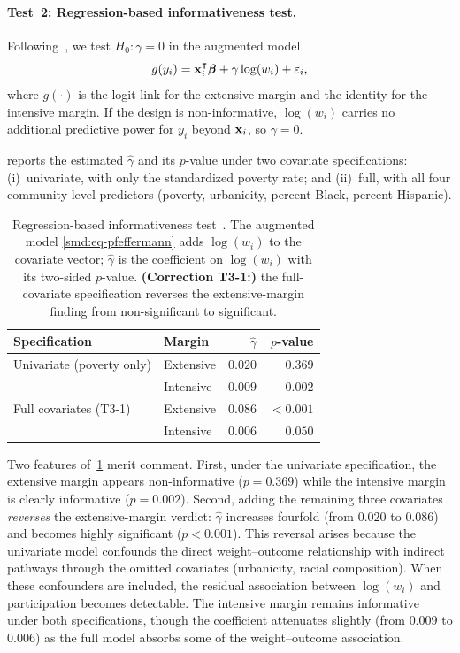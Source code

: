 \paragraph{Test~2: Regression-based informativeness test.}
Following~\citet{Pfeffermann1993}, we test $H_0\colon \gamma = 0$ in
the augmented model
\begin{equation}\label{smd:eq-pfeffermann}
  g(y_i) = \mathbf{x}_i^\intercal \boldsymbol{\beta} + \gamma \log(w_i) + \varepsilon_i,
\end{equation}
where $g(\cdot)$ is the logit link for the extensive margin and the
identity for the intensive margin.  If the design is non-informative,
$\log(w_i)$ carries no additional predictive power for $y_i$ beyond
$\mathbf{x}_i$, so $\gamma = 0$.

 reports the estimated $\hat{\gamma}$ and
its $p$-value under two covariate specifications: (i)~univariate, with
only the standardized poverty rate; and (ii)~full, with all four
community-level predictors (poverty, urbanicity, percent Black, percent
Hispanic).

\begin{table}[htbp]
  \centering
  \caption{Regression-based informativeness test~\citep{Pfeffermann1993}.
    The augmented model \eqref{smd:eq-pfeffermann} adds $\log(w_i)$ to the
    covariate vector; $\hat{\gamma}$ is the coefficient on $\log(w_i)$
    with its two-sided $p$-value.  {\upshape\textbf{(Correction T3-1:)}}
    the full-covariate specification reverses the extensive-margin
    finding from non-significant to significant.}
  \label{smd:tab-pfeffermann}
  \smallskip
  \begin{tabular}{llrr}
    \toprule
    Specification & Margin & $\hat{\gamma}$ & $p$-value \\
    \midrule
    Univariate (poverty only)
      & Extensive  & $0.020$  & $0.369$   \\
      & Intensive  & $0.009$  & $0.002$   \\[4pt]
    Full covariates (T3-1)
      & Extensive  & $0.086$  & $<0.001$  \\
      & Intensive  & $0.006$  & $0.050$   \\
    \bottomrule
  \end{tabular}
\end{table}

Two features of~\cref{smd:tab-pfeffermann} merit comment.  First, under
the univariate specification, the extensive margin appears
non-informative ($p = 0.369$) while the intensive margin is clearly
informative ($p = 0.002$).  Second, adding the remaining three
covariates \emph{reverses} the extensive-margin verdict: $\hat{\gamma}$
increases fourfold (from $0.020$ to $0.086$) and becomes highly
significant ($p < 0.001$).  This reversal arises because the univariate
model confounds the direct weight--outcome relationship with indirect
pathways through the omitted covariates (urbanicity, racial
composition).  When these confounders are included, the residual
association between $\log(w_i)$ and participation becomes detectable.
The intensive margin remains informative under both specifications,
though the coefficient attenuates slightly (from $0.009$ to $0.006$)
as the full model absorbs some of the weight--outcome association.

